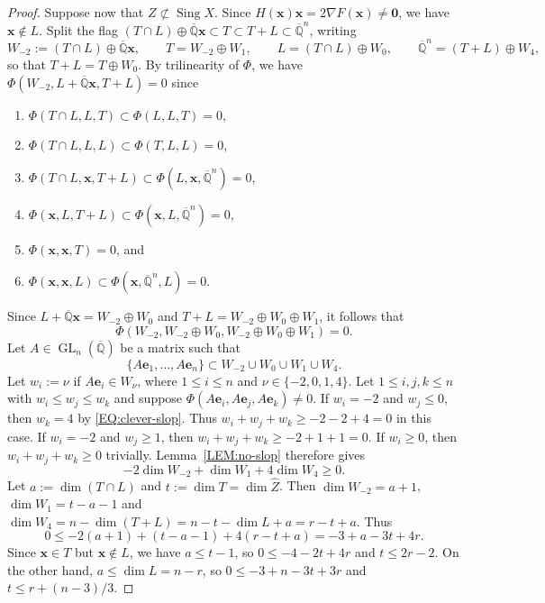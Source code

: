 \documentclass[a4paper,11pt, twoside,reqno]{amsart}
\theoremstyle{plain}
\theoremstyle{definition}
\theoremstyle{remark}
\newcommand{\bfe}{\bm{e}}
\newcommand{\bfx}{\bm{x}}
\DeclareMathOperator{\sing}{Sing}
\DeclareMathOperator{\GL}{GL}
\renewcommand{\le}{\leqslant}
\renewcommand{\ge}{\geqslant}
\newcommand{\Qbar}{\overline{\mathbb{Q}}}
\newcommand{\cone}{\widehat}
\numberwithin{equation}{section}
\begin{document}
\begin{proof}
Suppose now that $Z\not\subset\sing X$.
Since $H(\bfx)\bfx=2\nabla F(\bfx)\ne \bm0$, we have $\bfx\notin L$.
Split the flag $(T\cap L)\oplus\Qbar\bfx \subset T \subset T+L \subset \Qbar^n$,
writing
\[
W_{-2} := (T\cap L)\oplus\Qbar\bfx,\qquad
T = W_{-2}\oplus W_1,\qquad
L = (T\cap L)\oplus W_0,\qquad
\Qbar^n = (T+L) \oplus W_4,
\]
so that $T+L = T\oplus W_0$.
By trilinearity of $\Phi$,
we have $\Phi(W_{-2},L+\Qbar\bfx,T+L)=0$ since
\begin{enumerate}
\item $\Phi(T\cap L,L,T) \subset \Phi(L,L,T)=0$,
\item $\Phi(T\cap L,L,L) \subset \Phi(T,L,L)=0$,
\item $\Phi(T\cap L,\bfx,T+L) \subset \Phi(L,\bfx,\Qbar^n)=0$,
\item $\Phi(\bfx,L,T+L) \subset \Phi(\bfx,L,\Qbar^n)=0$,
\item $\Phi(\bfx,\bfx,T)=0$, and
\item $\Phi(\bfx,\bfx,L) \subset \Phi(\bfx,\Qbar^n,L)=0$.
\end{enumerate}
Since $L+\Qbar\bfx=W_{-2} \oplus W_0$ and $T+L=W_{-2} \oplus W_0 \oplus W_1$,
it follows that
\begin{equation}
\label{EQ:clever-slop}
\Phi(W_{-2},W_{-2} \oplus W_0,W_{-2} \oplus W_0 \oplus W_1)=0.
\end{equation}
Let $A\in \GL_n(\Qbar)$ be a matrix such that
$$\{A\bfe_1,\dots,A\bfe_n\}
\subset W_{-2} \cup W_0 \cup W_1 \cup W_4.$$
Let $w_i := \nu$ if $A\bfe_i\in W_\nu$, where $1\le i\le n$ and $\nu\in \{-2,0,1,4\}$.
Let $1\le i,j,k\le n$ with $w_i\le w_j\le w_k$
and suppose $\Phi(A\bfe_i,A\bfe_j,A\bfe_k) \ne 0$.
If $w_i=-2$ and $w_j\le 0$, then $w_k=4$ by \eqref{EQ:clever-slop}.
Thus $w_i+w_j+w_k \ge -2-2+4 = 0$ in this case.
If $w_i=-2$ and $w_j\ge 1$, then $w_i+w_j+w_k \ge -2+1+1 = 0$.
If $w_i\ge 0$, then $w_i+w_j+w_k\ge 0$ trivially.
Lemma~\ref{LEM:no-slop} therefore gives
\begin{equation*}
-2\dim W_{-2} + \dim W_1 + 4 \dim W_4 \ge 0.
\end{equation*}
Let $a := \dim(T\cap L)$ and $t := \dim T = \dim \cone Z$.
Then $\dim W_{-2} = a + 1$,
$\dim W_1 = t - a - 1$
and $\dim W_4 = n - \dim (T+L) = n - t - \dim L + a
= r - t + a$.
Thus
\begin{equation*}
0\le -2(a+1) + (t-a-1) + 4(r-t+a)
= -3+a-3t+4r.
\end{equation*}
Since $\bfx\in T$ but $\bfx\notin L$, we have $a\le t-1$,
so $0 \le -4-2t+4r$ and $t\le 2r-2$.
On the other hand, $a\le \dim L = n-r$,
so $0 \le -3+n-3t+3r$ and $t\le r + (n-3)/3$.
\end{proof}
\end{document}
